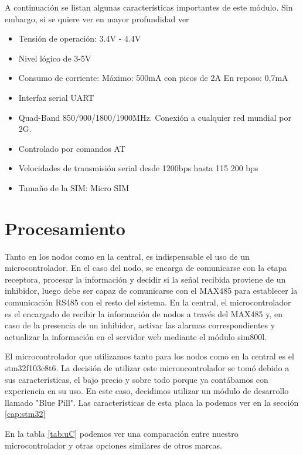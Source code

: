A continuación se listan algunas características importantes de este módulo. Sin embargo, si se quiere ver en mayor profundidad ver \todo

\begin{itemize}
    \item Tensión de operación: 3.4V - 4.4V
    \item Nivel lógico de 3-5V
    \item Consumo de corriente:
    \subitem Máximo: 500mA con picos de 2A
    \subitem En reposo: 0,7mA
    \item Interfaz serial UART
    \item Quad-Band 850/900/1800/1900MHz. Conexión a cualquier red mundial por 2G.
    \item Controlado por comandos AT
    \item Velocidades de transmisión serial desde 1200bps hasta 115 200 bps
    \item Tamaño de la SIM: Micro SIM
\end{itemize}

\section{Procesamiento} \par

Tanto en los nodos como en la central, es indispensable el uso de un microcontrolador. En el caso del nodo, se encarga de comunicarse con la etapa receptora,
procesar la información y decidir si la señal recibida proviene de un inhibidor, luego debe ser capaz de comunicarse con el MAX485 para establecer la comunicación
RS485 con el resto del sistema. En la central, el microcontrolador es el encargado de recibir la información de nodos a través del MAX485 y,
en caso de la presencia de un inhibidor, activar las alarmas correspondientes y actualizar la información en el servidor web mediante el módulo sim800l. \par

El microcontrolador que utilizamos tanto para los nodos como en la central es el stm32f103c8t6. La decisión de utilizar este microncontrolador se tomó debido 
a sus características, el bajo precio y sobre todo porque ya contábamos con experiencia en su uso.
En este caso, decidimos utilizar un módulo de desarrollo llamado "Blue Pill". Las características de esta placa la podemos ver en la sección \ref{cap:stm32}

En la tabla \ref{tab:uC} podemos ver una comparación entre nuestro microcontrolador y otras opciones similares de otros marcas.

